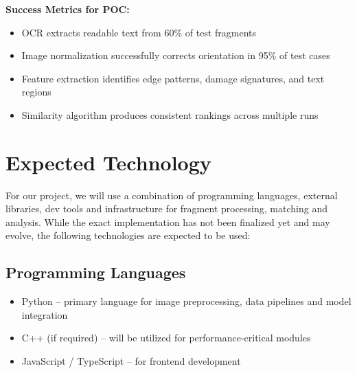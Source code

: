 \documentclass{article}
\begin{document}
\textbf{Success Metrics for POC:}
\begin{itemize}
\item OCR extracts readable text from 60\% of test fragments
\item Image normalization successfully corrects orientation in 95\% of test cases
\item Feature extraction identifies edge patterns, damage signatures, and text regions
\item Similarity algorithm produces consistent rankings across multiple runs
\end{itemize}

\section{Expected Technology}

\noindent For our project, we will use a combination of programming languages, external libraries, dev tools and infrastructure for fragment processing, matching and analysis. While the exact implementation has not been finalized yet and may evolve, the following technologies are expected to be used:

\subsection*{Programming Languages}
\begin{itemize}
    \item Python -- primary language for image preprocessing, data pipelines and model integration
    \item C++ (if required) -- will be utilized for performance-critical modules
    \item JavaScript / TypeScript -- for frontend development
\end{itemize}
\end{document}
